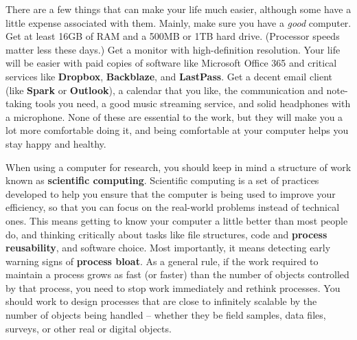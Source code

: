 There are a few things that can make your life much easier,
although some have a little expense associated with them.
Mainly, make sure you have a \textit{good} computer.
Get at least 16GB of RAM and a 500MB or 1TB hard drive.
(Processor speeds matter less these days.)
Get a monitor with high-definition resolution.
Your life will be easier with paid copies of software like Microsoft Office 365
and critical services like \textbf{Dropbox}, \textbf{Backblaze}, and \textbf{LastPass}.
Get a decent email client (like \textbf{Spark} or \textbf{Outlook}),
a calendar that you like, the communication and note-taking tools you need,
a good music streaming service, and solid headphones with a microphone.
None of these are essential to the work,
but they will make you a lot more comfortable doing it,
and being comfortable at your computer helps you stay happy and healthy.

When using a computer for research,
you should keep in mind a structure of work
known as \textbf{scientific computing}.\cite{wilson2014best,wilson2017good}
Scientific computing is a set of practices developed to help you
ensure that the computer is being used to improve your efficiency,
so that you can focus on the real-world problems instead of technical ones.
This means getting to know your computer a little better than most people do,
and thinking critically about tasks like file structures,
code and \textbf{process reusability},
and software choice. Most importantly,
it means detecting early warning signs of \textbf{process bloat}.
As a general rule, if the work required to maintain a process
grows as fast (or faster) than the number of objects controlled by that process,
you need to stop work immediately and rethink processes.
You should work to design processes that are
close to infinitely scalable by the number of objects being handled --
whether they be field samples, data files, surveys, or other real or digital objects.

